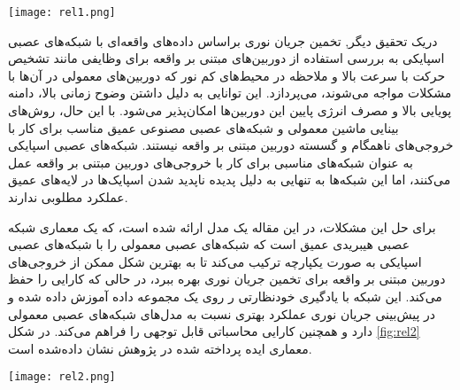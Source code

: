 \begin{minipage}{\linewidth}
	\centering
	\texttt{[image: rel1.png]}
	\captionsetup{font=small} %
	\label{fig:rel1}
\end{minipage}




دریک تحقیق دیگر, تخمین جریان نوری براساس داده‌های واقعه‌ای با شبکه‌های عصبی اسپایکی به بررسی استفاده از دوربین‌های مبتنی بر واقعه  برای وظایفی مانند تشخیص حرکت با سرعت بالا و ملاحظه در محیط‌های کم نور که دوربین‌های معمولی در آن‌ها با مشکلات مواجه می‌شوند، می‌پردازد. این توانایی به دلیل داشتن وضوح زمانی بالا، دامنه پویایی بالا و مصرف انرژی پایین این دوربین‌ها امکان‌پذیر می‌شود. با این حال، روش‌های بینایی ماشین معمولی و شبکه‌های عصبی مصنوعی عمیق مناسب برای کار با خروجی‌های ناهمگام و گسسته دوربین مبتنی بر واقعه نیستند. شبکه‌های عصبی اسپایکی به عنوان شبکه‌های مناسبی برای کار با خروجی‌های دوربین مبتنی بر واقعه عمل می‌کنند، اما این شبکه‌ها به تنهایی  به دلیل پدیده ناپدید شدن اسپایک‌ها در لایه‌های عمیق عملکرد مطلوبی ندارند.

برای حل این مشکلات، در این مقاله یک مدل ارائه شده است، که یک معماری شبکه عصبی هیبریدی عمیق است که شبکه‌های عصبی معمولی را با شبکه‌های عصبی اسپایکی به صورت یکپارچه ترکیب می‌کند تا به بهترین شکل ممکن از خروجی‌های دوربین مبتنی بر واقعه برای تخمین جریان نوری بهره ببرد، در حالی که کارایی را حفظ می‌کند.
 این شبکه با یادگیری خودنظارتی ر روی یک مجموعه داده آموزش داده شده و در پیش‌بینی جریان نوری عملکرد بهتری نسبت به مدل‌های شبکه‌های عصبی معمولی دارد و همچنین کارایی محاسباتی قابل توجهی را فراهم می‌کند. در شکل \ref{fig:rel2} معماری ایده پرداخته شده در پژوهش نشان داده‌شده است.


\begin{minipage}{\linewidth}
	\centering
	\texttt{[image: rel2.png]}
	\captionsetup{font=small} %
	\label{fig:rel2}
\end{minipage}






